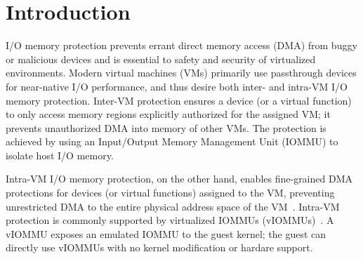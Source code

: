 \section{Introduction}

I/O memory protection prevents errant direct memory access (DMA)
    from buggy or malicious devices and is essential
    to safety and security of virtualized environments.
Modern virtual machines (VMs) 
    primarily use passthrough devices 
    for near-native I/O performance,
    and thus desire both inter- and intra-VM I/O memory protection.
Inter-VM protection ensures a device (or a virtual function) to only access memory 
    regions explicitly authorized for the assigned VM;
    it prevents unauthorized DMA %
    into memory of other VMs. 
The protection is achieved by using an Input/Output Memory Management Unit (IOMMU)
    to isolate host I/O memory.

Intra-VM I/O memory protection, on the other hand, 
    enables fine-grained DMA protections for devices (or virtual functions) assigned to the VM,
    preventing unrestricted DMA 
    to the entire physical address space of the VM~\cite{Amit2011vIOMMU,RajapakshaIOMMU,AlexCodeInjection}.
Intra-VM protection is commonly supported by virtualized IOMMUs (vIOMMUs)~\cite{Amit2011vIOMMU,Tian2020coIOMMU}. 
A vIOMMU exposes an emulated IOMMU to the guest kernel;
the guest can directly use vIOMMUs with no kernel modification or hardare 
    support.

    
